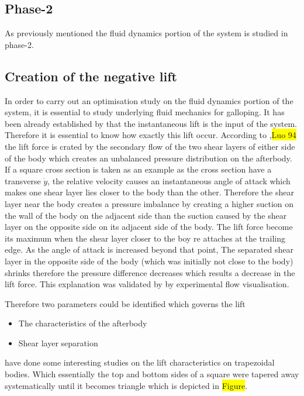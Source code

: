 \documentclass{article}
\newcommand{\hilight}[1]{\colorbox{yellow}{#1}}
\begin{document}
\subsection{Phase-2}

As previously mentioned the fluid dynamics portion of the system is studied in phase-2.

\subsection{Creation of the negative lift}

In order to carry out an optimisation study on the fluid dynamics portion of the system, it is essential to study underlying fluid mechanics for galloping. It has been already established by \cite{Parkinson1964} that the instantaneous lift is the input of the system. Therefore it is essential to know how exactly this lift occur. According to \cite{Parkinson1989},\hilight{Luo 94} the lift force is crated by the secondary flow of the two shear layers of either side of the body which creates an unbalanced pressure distribution on the afterbody. If a square cross section is taken as an example as the cross section have a transverse $\dot{y}$, the relative velocity causes an instantaneous angle of attack which makes one shear layer lies closer to the body than the other. Therefore the shear layer near the body creates a pressure imbalance by creating a higher suction on the wall of the body on the adjacent side than the suction caused by the shear layer on the opposite side on its adjacent side of the body. The lift force become its maximum when the shear layer closer to the boy re attaches at the trailing edge. As the angle of attack is increased beyond that point, The separated shear layer in the opposite side of the body (which was initially not close to the body) shrinks therefore the pressure difference decreases which results a decrease in the lift force. This explanation was validated by \cite{Luo1994} by experimental flow visualisation.

Therefore two parameters could be identified which governs the lift 

\begin{itemize}
\item{ The characteristics of the afterbody}
\item{Shear layer separation}
\end{itemize}
 
\cite{Luo1994} have done some interesting studies on the lift characteristics on trapezoidal bodies. Which essentially the top and bottom sides of a square were tapered away systematically until it becomes triangle which is depicted in \hilight{Figure}.
\end{document}
